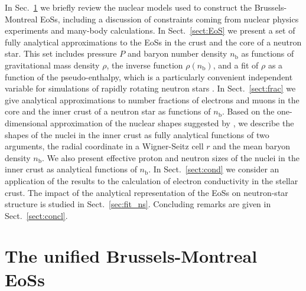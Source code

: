 \documentclass{aa}
\newcommand{\nb}{n_\mathrm{b}}
\begin{document}
In Sec.~\ref{sect:propeos} we briefly review the nuclear models 
used to construct the Brussels-Montreal EoSs, including a discussion 
of constraints coming from nuclear physics experiments and many-body 
calculations.
In Sect.~\ref{sect:EoS} we present a set of fully analytical
approximations to the EoSs in the crust and the core of a
neutron star. This set includes pressure $P$ and baryon
number density $\nb$ as  functions of gravitational mass
density $\rho$,  the inverse function $\rho(\nb)$, and a fit
of $\rho$ as a function of the pseudo-enthalpy, which is a
particularly convenient independent variable for simulations
of rapidly rotating neutron stars \citep{Bonazzola-ea93}. In
Sect.~\ref{sect:frac} we give analytical approximations to
number fractions of electrons and muons in the core and the
inner crust of a neutron star as functions  of $\nb$.
Based on the one-dimensional
approximation of the nuclear shapes suggested by
\citet{Onsi-ea08}, we describe the shapes of the nuclei in
the inner crust as fully analytical functions of two
arguments, the radial coordinate in a Wigner-Seitz cell $r$
and the mean baryon density $\nb$. We also present effective
proton and neutron sizes of the nuclei in the inner crust as
analytical functions of $\nb$. In Sect.~\ref{sect:cond} we
consider an application of the results to the calculation of
electron conductivity in the stellar crust. The impact of
the analytical representation  of the EoSs on neutron-star
structure is studied in  Sect.~\ref{sec:fit_ns}.  Concluding
remarks are given in Sect.~\ref{sect:concl}.


\section{The unified Brussels-Montreal EoSs}
\label{sect:propeos}
\end{document}
